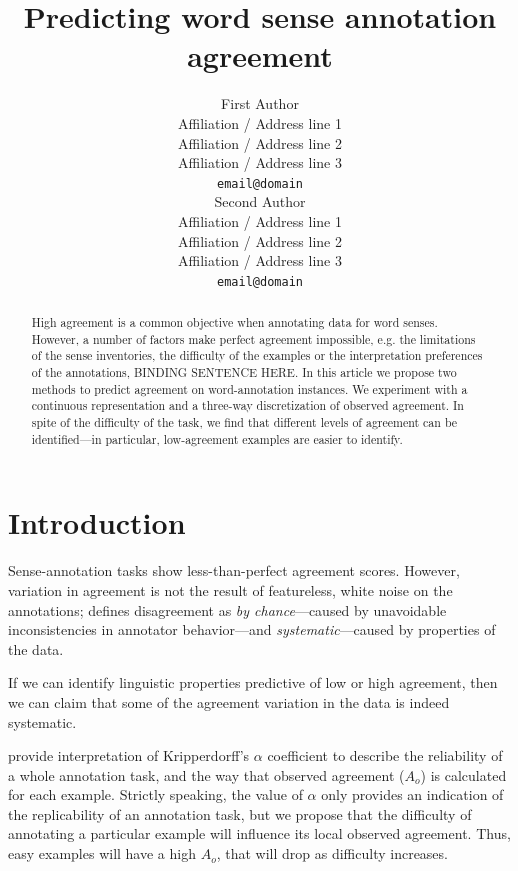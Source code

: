\documentclass[11pt,a4paper]{article}
\title{Predicting word sense annotation agreement}
\author{First Author \\
  Affiliation / Address line 1 \\
  Affiliation / Address line 2 \\
  Affiliation / Address line 3 \\
  {\tt email@domain} \\\And
  Second Author \\
  Affiliation / Address line 1 \\
  Affiliation / Address line 2 \\
  Affiliation / Address line 3 \\
  {\tt email@domain} \\}
\date{}
\begin{document}
\maketitle
\begin{abstract}


High agreement is a common objective when annotating data for word senses.  
However, a number of factors make perfect agreement impossible, e.g. the limitations of the sense inventories, the difficulty of the examples or the interpretation preferences of the annotations,
BINDING SENTENCE HERE.
In this article we propose two methods to predict agreement on word-annotation instances. We experiment with a continuous representation and a three-way discretization of observed agreement. In spite of the difficulty of the task, we find that different levels of agreement can be identified---in particular, low-agreement examples are easier to identify.
\end{abstract}
\section{Introduction}

Sense-annotation tasks show less-than-perfect agreement scores. However, variation in agreement is not the result of featureless, white noise on the annotations;  defines disagreement as \textit{by chance}---caused by unavoidable inconsistencies in annotator behavior---and \textit{systematic}---caused by properties of the data.

If we can identify linguistic properties predictive of low or high agreement, then we can claim that some of the agreement variation in the data is indeed systematic. %



 provide interpretation of Kripperdorff's $\alpha$ coefficient to describe the reliability of a whole annotation task, and the way that observed agreement ($A_o$) is calculated for each example. Strictly speaking, the value of $\alpha$ only provides an indication of the replicability of an annotation task, but we propose that the difficulty of annotating a particular example will influence its local observed agreement. Thus, easy examples will have a high $A_o$, that will drop as difficulty increases. 


\end{document}
